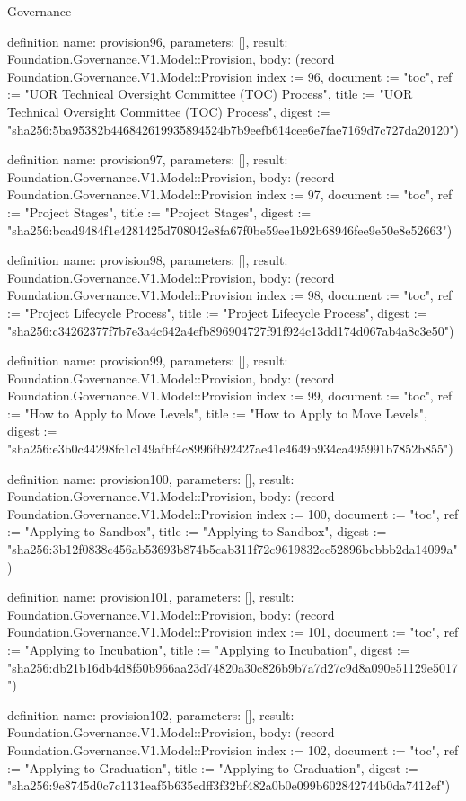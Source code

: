 \begin{lexlean}{Governance}
\begin{semanticmodule}
definition{
  name: provision96,
  parameters: [],
  result: Foundation.Governance.V1.Model::Provision,
  body: (record Foundation.Governance.V1.Model::Provision {index := 96, document := "toc", ref := "UOR Technical Oversight Committee (TOC) Process", title := "UOR Technical Oversight Committee (TOC) Process", digest := "sha256:5ba95382b446842619935894524b7b9eefb614cee6e7fae7169d7c727da20120"})
}

definition{
  name: provision97,
  parameters: [],
  result: Foundation.Governance.V1.Model::Provision,
  body: (record Foundation.Governance.V1.Model::Provision {index := 97, document := "toc", ref := "Project Stages", title := "Project Stages", digest := "sha256:bcad9484f1e4281425d708042e8fa67f0be59ee1b92b68946fee9e50e8e52663"})
}

definition{
  name: provision98,
  parameters: [],
  result: Foundation.Governance.V1.Model::Provision,
  body: (record Foundation.Governance.V1.Model::Provision {index := 98, document := "toc", ref := "Project Lifecycle Process", title := "Project Lifecycle Process", digest := "sha256:c34262377f7b7e3a4c642a4efb896904727f91f924c13dd174d067ab4a8c3e50"})
}

definition{
  name: provision99,
  parameters: [],
  result: Foundation.Governance.V1.Model::Provision,
  body: (record Foundation.Governance.V1.Model::Provision {index := 99, document := "toc", ref := "How to Apply to Move Levels", title := "How to Apply to Move Levels", digest := "sha256:e3b0c44298fc1c149afbf4c8996fb92427ae41e4649b934ca495991b7852b855"})
}

definition{
  name: provision100,
  parameters: [],
  result: Foundation.Governance.V1.Model::Provision,
  body: (record Foundation.Governance.V1.Model::Provision {index := 100, document := "toc", ref := "Applying to Sandbox", title := "Applying to Sandbox", digest := "sha256:3b12f0838c456ab53693b874b5cab311f72c9619832cc52896bcbbb2da14099a"})
}

definition{
  name: provision101,
  parameters: [],
  result: Foundation.Governance.V1.Model::Provision,
  body: (record Foundation.Governance.V1.Model::Provision {index := 101, document := "toc", ref := "Applying to Incubation", title := "Applying to Incubation", digest := "sha256:db21b16db4d8f50b966aa23d74820a30c826b9b7a7d27c9d8a090e51129e5017"})
}

definition{
  name: provision102,
  parameters: [],
  result: Foundation.Governance.V1.Model::Provision,
  body: (record Foundation.Governance.V1.Model::Provision {index := 102, document := "toc", ref := "Applying to Graduation", title := "Applying to Graduation", digest := "sha256:9e8745d0c7c1131eaf5b635edff3f32bf482a0b0e099b602842744b0da7412ef"})
}


\end{semanticmodule}
\end{lexlean}

